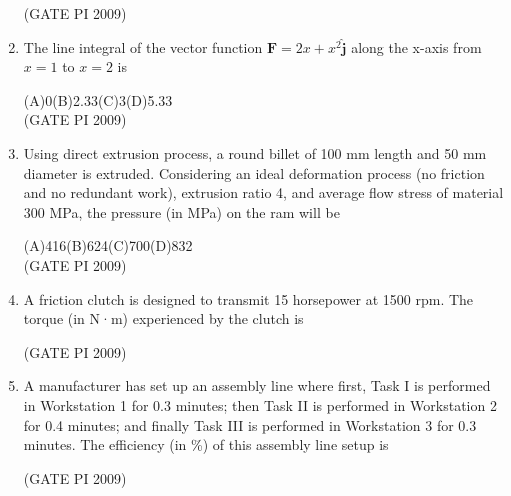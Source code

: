 \documentclass[journal,12pt,onecolumn]{IEEEtran}
\theoremstyle{remark}
\begin{document}
\begin{enumerate}[label=Q.\arabic*]
\begin{enumerate}[label=(\Alph*)]
\end{enumerate}
\hfill (GATE PI 2009)
\item The line integral of the vector function $\mathbf{F} = 2x + x^2 \mathbf{\hat{j}}$ along the x-axis from $x=1$ to $x=2$ is

(A)0\hfill(B)2.33\hfill(C)3\hfill(D)5.33 \\

\hfill (GATE PI 2009)
\item Using direct extrusion process, a round billet of 100 mm length and 50 mm diameter is extruded. Considering an ideal deformation process (no friction and no redundant work), extrusion ratio 4, and average flow stress of material 300 MPa, the pressure (in MPa) on the ram will be

(A)416\hfill(B)624\hfill(C)700\hfill(D)832\\

\hfill (GATE PI 2009)
\item A friction clutch is designed to transmit 15 horsepower at 1500 rpm. The torque (in N·m) experienced by the clutch is
\begin{enumerate}[label=(\Alph*)]
\end{enumerate}
\hfill (GATE PI 2009)
\item A manufacturer has set up an assembly line where first, Task I is performed in Workstation 1 for 0.3 minutes; then Task II is performed in Workstation 2 for 0.4 minutes; and finally Task III is performed in Workstation 3 for 0.3 minutes. The efficiency (in \%) of this assembly line setup is
\begin{enumerate}[label=(\Alph*)]
\end{enumerate}
\hfill (GATE PI 2009)


\end{enumerate}
\end{document}
